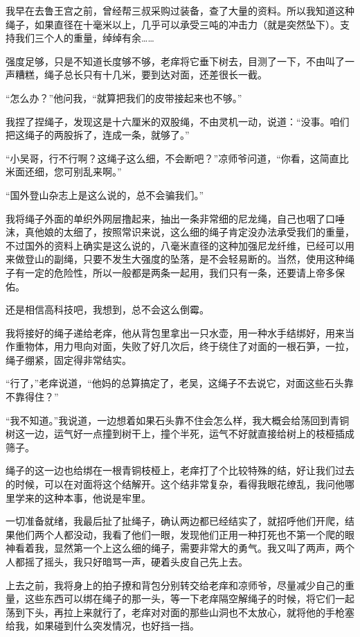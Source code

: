 我早在去鲁王宫之前，曾经帮三叔采购过装备，查了大量的资料。所以我知道这种绳子，如果直径在十毫米以上，几乎可以承受三吨的冲击力（就是突然坠下）。支持我们三个人的重量，绰绰有余……

强度足够，只是不知道长度够不够，老痒将它垂下树去，目测了一下，不由叫了一声糟糕，绳子总长只有十几米，要到达对面，还差很长一截。

“怎么办？”他问我，“就算把我们的皮带接起来也不够。”

我捏了捏绳子，发现这是十六厘米的双股绳，不由灵机一动，说道：“没事。咱们把这绳子的两股拆了，连成一条，就够了。”

“小吴哥，行不行啊？这绳子这么细，不会断吧？”凉师爷问道，“你看，这简直比米面还细，您可别乱来啊。”

“国外登山杂志上是这么说的，总不会骗我们。”

我将绳子外面的单织外网层撸起来，抽出一条非常细的尼龙绳，自己也咽了口唾沫，真他娘的太细了，按照常识来说，这么细的绳子肯定没办法承受我们的重量，不过国外的资料上确实是这么说的，八毫米直径的这种加强尼龙纤维，已经可以用来做登山的副绳，只要不发生大强度的坠落，是不会轻易断的。当然，使用这种绳子有一定的危险性，所以一般都是两条一起用，我们只有一条，还要请上帝多保佑。

还是相信高科技吧，我想到，总不会这么倒霉。

我将接好的绳子递给老痒，他从背包里拿出一只水壶，用一种水手结绑好，用来当作重物体，用力甩向对面，失败了好几次后，终于绕住了对面的一根石笋，一拉，绳子绷紧，固定得非常结实。

“行了，”老痒说道，“他妈的总算搞定了，老吴，这绳子不去说它，对面这些石头靠不靠得住？”

“我不知道。”我说道，一边想着如果石头靠不住会怎么样，我大概会给荡回到青铜树这一边，运气好一点撞到树干上，撞个半死，运气不好就直接给树上的枝桠插成筛子。

绳子的这一边也给绑在一根青铜枝桠上，老痒打了个比较特殊的结，好让我们过去的时候，可以在对面将这个结解开。这个结非常复杂，看得我眼花缭乱，我问他哪里学来的这种本事，他说是牢里。

一切准备就绪，我最后扯了扯绳子，确认两边都已经结实了，就招呼他们开爬，结果他们两个人都没动，我看了他们一眼，发现他们正用一种打死也不第一个爬的眼神看着我，显然第一个上这么细的绳子，需要非常大的勇气。我又叫了两声，两个人都摇了摇头，我只好暗骂一声，硬着头皮自己先上去。

上去之前，我将身上的拍子撩和背包分别转交给老痒和凉师爷，尽量减少自己的重量，这些东西可以绑在绳子的那一头，等一下老痒隔空解绳子的时候，将它们一起荡到下头，再拉上来就行了，老痒对对面的那些山洞也不太放心，就将他的手枪塞给我，如果碰到什么突发情况，也好挡一挡。

